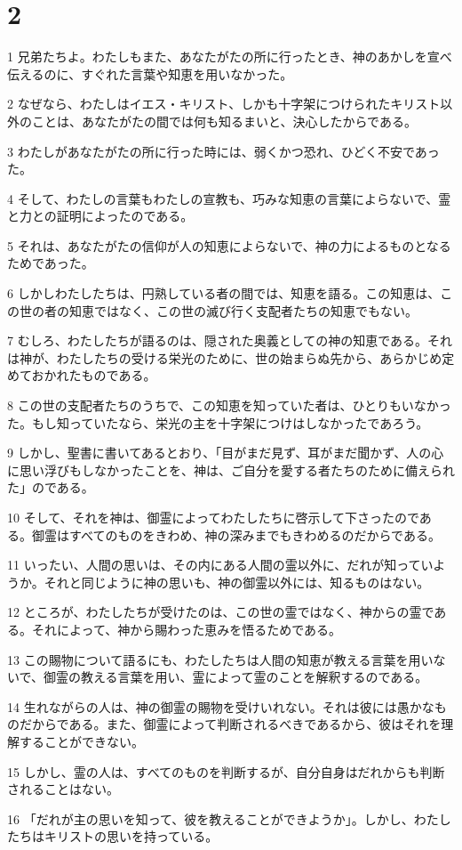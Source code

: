 \chapter{2}

\par 1 兄弟たちよ。わたしもまた、あなたがたの所に行ったとき、神のあかしを宣べ伝えるのに、すぐれた言葉や知恵を用いなかった。
\par 2 なぜなら、わたしはイエス・キリスト、しかも十字架につけられたキリスト以外のことは、あなたがたの間では何も知るまいと、決心したからである。
\par 3 わたしがあなたがたの所に行った時には、弱くかつ恐れ、ひどく不安であった。
\par 4 そして、わたしの言葉もわたしの宣教も、巧みな知恵の言葉によらないで、霊と力との証明によったのである。
\par 5 それは、あなたがたの信仰が人の知恵によらないで、神の力によるものとなるためであった。
\par 6 しかしわたしたちは、円熟している者の間では、知恵を語る。この知恵は、この世の者の知恵ではなく、この世の滅び行く支配者たちの知恵でもない。
\par 7 むしろ、わたしたちが語るのは、隠された奥義としての神の知恵である。それは神が、わたしたちの受ける栄光のために、世の始まらぬ先から、あらかじめ定めておかれたものである。
\par 8 この世の支配者たちのうちで、この知恵を知っていた者は、ひとりもいなかった。もし知っていたなら、栄光の主を十字架につけはしなかったであろう。
\par 9 しかし、聖書に書いてあるとおり、「目がまだ見ず、耳がまだ聞かず、人の心に思い浮びもしなかったことを、神は、ご自分を愛する者たちのために備えられた」のである。
\par 10 そして、それを神は、御霊によってわたしたちに啓示して下さったのである。御霊はすべてのものをきわめ、神の深みまでもきわめるのだからである。
\par 11 いったい、人間の思いは、その内にある人間の霊以外に、だれが知っていようか。それと同じように神の思いも、神の御霊以外には、知るものはない。
\par 12 ところが、わたしたちが受けたのは、この世の霊ではなく、神からの霊である。それによって、神から賜わった恵みを悟るためである。
\par 13 この賜物について語るにも、わたしたちは人間の知恵が教える言葉を用いないで、御霊の教える言葉を用い、霊によって霊のことを解釈するのである。
\par 14 生れながらの人は、神の御霊の賜物を受けいれない。それは彼には愚かなものだからである。また、御霊によって判断されるべきであるから、彼はそれを理解することができない。
\par 15 しかし、霊の人は、すべてのものを判断するが、自分自身はだれからも判断されることはない。
\par 16 「だれが主の思いを知って、彼を教えることができようか」。しかし、わたしたちはキリストの思いを持っている。

